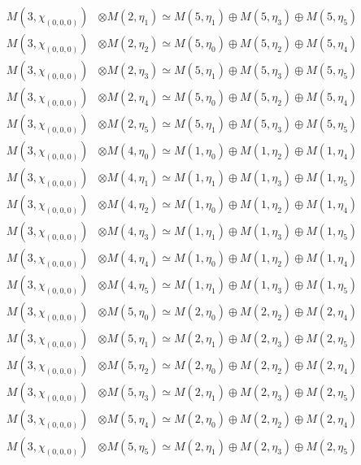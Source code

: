 \begin{align*}
M(3,\chi_{(0,0,0)}) &\otimes M(2,\eta_{1}) \simeq M(5,\eta_{1}) \oplus M(5,\eta_{3}) \oplus M(5,\eta_{5}) \\
M(3,\chi_{(0,0,0)}) &\otimes M(2,\eta_{2}) \simeq M(5,\eta_{0}) \oplus M(5,\eta_{2}) \oplus M(5,\eta_{4}) \\
M(3,\chi_{(0,0,0)}) &\otimes M(2,\eta_{3}) \simeq M(5,\eta_{1}) \oplus M(5,\eta_{3}) \oplus M(5,\eta_{5}) \\
M(3,\chi_{(0,0,0)}) &\otimes M(2,\eta_{4}) \simeq M(5,\eta_{0}) \oplus M(5,\eta_{2}) \oplus M(5,\eta_{4}) \\
M(3,\chi_{(0,0,0)}) &\otimes M(2,\eta_{5}) \simeq M(5,\eta_{1}) \oplus M(5,\eta_{3}) \oplus M(5,\eta_{5}) \\
M(3,\chi_{(0,0,0)}) &\otimes M(4,\eta_{0}) \simeq M(1,\eta_{0}) \oplus M(1,\eta_{2}) \oplus M(1,\eta_{4}) \\
M(3,\chi_{(0,0,0)}) &\otimes M(4,\eta_{1}) \simeq M(1,\eta_{1}) \oplus M(1,\eta_{3}) \oplus M(1,\eta_{5}) \\
M(3,\chi_{(0,0,0)}) &\otimes M(4,\eta_{2}) \simeq M(1,\eta_{0}) \oplus M(1,\eta_{2}) \oplus M(1,\eta_{4}) \\
M(3,\chi_{(0,0,0)}) &\otimes M(4,\eta_{3}) \simeq M(1,\eta_{1}) \oplus M(1,\eta_{3}) \oplus M(1,\eta_{5}) \\
M(3,\chi_{(0,0,0)}) &\otimes M(4,\eta_{4}) \simeq M(1,\eta_{0}) \oplus M(1,\eta_{2}) \oplus M(1,\eta_{4}) \\
M(3,\chi_{(0,0,0)}) &\otimes M(4,\eta_{5}) \simeq M(1,\eta_{1}) \oplus M(1,\eta_{3}) \oplus M(1,\eta_{5}) \\
M(3,\chi_{(0,0,0)}) &\otimes M(5,\eta_{0}) \simeq M(2,\eta_{0}) \oplus M(2,\eta_{2}) \oplus M(2,\eta_{4}) \\
M(3,\chi_{(0,0,0)}) &\otimes M(5,\eta_{1}) \simeq M(2,\eta_{1}) \oplus M(2,\eta_{3}) \oplus M(2,\eta_{5}) \\
M(3,\chi_{(0,0,0)}) &\otimes M(5,\eta_{2}) \simeq M(2,\eta_{0}) \oplus M(2,\eta_{2}) \oplus M(2,\eta_{4}) \\
M(3,\chi_{(0,0,0)}) &\otimes M(5,\eta_{3}) \simeq M(2,\eta_{1}) \oplus M(2,\eta_{3}) \oplus M(2,\eta_{5}) \\
M(3,\chi_{(0,0,0)}) &\otimes M(5,\eta_{4}) \simeq M(2,\eta_{0}) \oplus M(2,\eta_{2}) \oplus M(2,\eta_{4}) \\
M(3,\chi_{(0,0,0)}) &\otimes M(5,\eta_{5}) \simeq M(2,\eta_{1}) \oplus M(2,\eta_{3}) \oplus M(2,\eta_{5}) \\
\end{align*}

